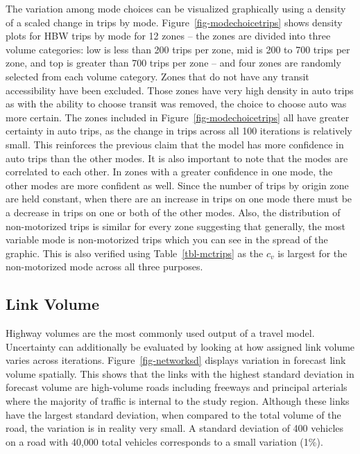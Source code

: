\documentclass[
  letterpaper,
  number,
  review,
  3p]{elsarticle}
\begin{document}
The variation among mode choices can be visualized graphically using a
density of a scaled change in trips by mode.
Figure~\ref{fig-modechoicetrips} shows density plots for HBW trips by
mode for 12 zones -- the zones are divided into three volume categories:
low is less than 200 trips per zone, mid is 200 to 700 trips per zone,
and top is greater than 700 trips per zone -- and four zones are
randomly selected from each volume category. Zones that do not have any
transit accessibility have been excluded. Those zones have very high
density in auto trips as with the ability to choose transit was removed,
the choice to choose auto was more certain. The zones included in
Figure~\ref{fig-modechoicetrips} all have greater certainty in auto
trips, as the change in trips across all 100 iterations is relatively
small. This reinforces the previous claim that the model has more
confidence in auto trips than the other modes. It is also important to
note that the modes are correlated to each other. In zones with a
greater confidence in one mode, the other modes are more confident as
well. Since the number of trips by origin zone are held constant, when
there are an increase in trips on one mode there must be a decrease in
trips on one or both of the other modes. Also, the distribution of
non-motorized trips is similar for every zone suggesting that generally,
the most variable mode is non-motorized trips which you can see in the
spread of the graphic. This is also verified using
Table~\ref{tbl-mctrips} as the \(c_v\) is largest for the non-motorized
mode across all three purposes.

\begin{sidewaysfigure}


\caption{\label{fig-modechoicetrips}Trip density for coefficient of
variation by mode for HBW trips.}

\end{sidewaysfigure}%

\subsection{Link Volume}\label{link-volume}

Highway volumes are the most commonly used output of a travel model.
Uncertainty can additionally be evaluated by looking at how assigned
link volume varies across iterations. Figure~\ref{fig-networksd}
displays variation in forecast link volume spatially. This shows that
the links with the highest standard deviation in forecast volume are
high-volume roads including freeways and principal arterials where the
majority of traffic is internal to the study region. Although these
links have the largest standard deviation, when compared to the total
volume of the road, the variation is in reality very small. A standard
deviation of 400 vehicles on a road with 40,000 total vehicles
corresponds to a small variation (1\%).
\end{document}
